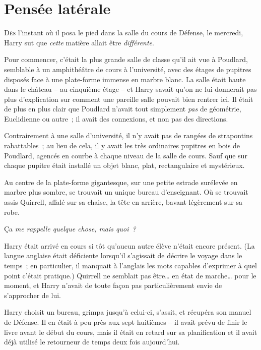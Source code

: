 
\chapter{Pensée latérale}

\lettrine{D}{ès} l'instant où il posa le pied dans la salle du cours de Défense, le mercredi, Harry sut que \emph{cette} matière allait être \emph{différente}.

Pour commencer, c'était la plus grande salle de classe qu'il ait vue à Poudlard, semblable à un amphithéâtre de cours à l'université, avec des étages de pupitres disposés face à une plate-forme immense en marbre blanc.
La salle était haute dans le château -- au cinquième étage -- et Harry savait qu'on ne lui donnerait pas plus d'explication sur comment une pareille salle pouvait bien rentrer ici.
Il était de plus en plus clair que Poudlard n'avait tout simplement \emph{pas} de géométrie, Euclidienne ou autre~; il avait des connexions, et non pas des directions.

Contrairement à une salle d'université, il n'y avait pas de rangées de strapontins rabattables~; au lieu de cela, il y avait les très ordinaires pupitres en bois de Poudlard, agencés en courbe à chaque niveau de la salle de cours.
Sauf que sur chaque pupitre était installé un objet blanc, plat, rectangulaire et mystérieux.

Au centre de la plate-forme gigantesque, sur une petite estrade surélevée en marbre plus sombre, se trouvait un unique bureau d'enseignant.
Où se trouvait assis Quirrell, affalé sur sa chaise, la tête en arrière, bavant légèrement sur sa robe.

Ça \emph{me rappelle quelque chose, mais quoi~?}

Harry était arrivé en cours si tôt qu'aucun autre élève n'était encore présent.
(La langue anglaise était déficiente lorsqu'il s'agissait de décrire le voyage dans le temps~;
en particulier, il manquait à l'anglais les mots capables d'exprimer à quel point c'était pratique.)
Quirrell ne semblait pas être… en état de marche… pour le moment, et Harry n'avait de toute façon pas particulièrement envie de s'approcher de lui.

Harry choisit un bureau, grimpa jusqu'à celui-ci, s'assit, et récupéra son manuel de Défense.
Il en était à peu près aux sept huitièmes -- il avait prévu de finir le livre avant le début du cours, mais il était en retard sur sa planification et il avait déjà utilisé le retourneur de temps deux fois aujourd'hui.

